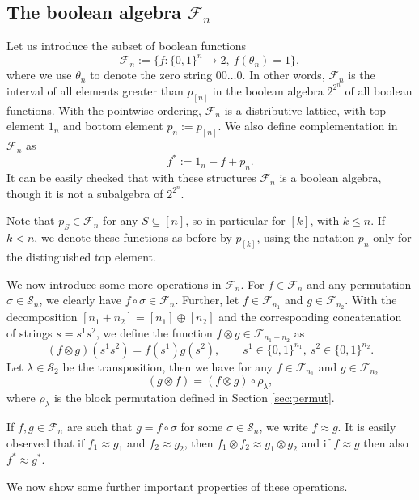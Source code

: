\documentclass[12pt]{article}
\theoremstyle{definition}
\theoremstyle{remark}
\def\Fe{\mathcal F}
\def\permut{\mathscr{S}}
\begin{document}

\subsection{The boolean algebra $\Fe_n$}


Let us introduce the subset of boolean functions 
\[
\Fe_n:=\{f:\{0,1\}^n\to 2,\ f(\theta_n)=1\},
\]
where we use $\theta_n$ to denote the zero string $00\dots 0$. 
In other words, $\Fe_n$ is the interval of all elements greater than $p_{[n]}$ in the boolean algebra 
$2^{2^n}$ of all boolean functions. With the pointwise ordering, $\Fe_n$ is a distributive lattice, with top element $1_n$ and 
 bottom element $p_n:=p_{[n]}$. We also define complementation  in $\Fe_n$ as
\[
f^*:=1_n-f+p_n.
\]
It can be easily checked that with these structures $\Fe_n$ is a boolean algebra, though
it is not a subalgebra of $2^{2^n}$.

Note that $p_S\in \Fe_n$ for any $S\subseteq [n]$, so in particular for $[k]$, with $k\le
n$. If $k<n$, we denote these functions as before by $p_{[k]}$, using the notation $p_n$
only for the distinguished top element.






We now introduce some more operations in $\Fe_n$. For $f\in \Fe_n$ and any permutation
$\sigma\in \permut_n$, we clearly have $f\circ \sigma\in \Fe_n$.
Further, let $f\in \Fe_{n_1}$ and $g\in \Fe_{n_2}$. With the decomposition
$[n_1+n_2]=[n_1]\oplus [n_2]$
and the corresponding concatenation of strings $s=s^1s^2$,  we define
the function $f\otimes g\in \Fe_{n_1+n_2}$ as
\[
(f\otimes g)(s^1s^2)=f(s^1)g(s^2),\qquad s^1\in \{0,1\}^{n_1},\ s^2\in \{0,1\}^{n_2}.
\]
Let $\lambda\in \permut_2$ be the transposition, then we have for any $f\in \Fe_{n_1}$ and
$g\in \Fe_{n_2}$
\[
(g\otimes f)=(f\otimes g)\circ \rho_\lambda,
\]
where $\rho_\lambda$ is the block permutation defined in  Section \ref{sec:permut}.

If $f,g\in \Fe_n$ are such that $g=f\circ\sigma$ for some $\sigma\in \permut_n$, we write
$f\approx g$. It is easily observed that if $f_1\approx g_1$ and $f_2\approx g_2$, then
$f_1\otimes f_2\approx g_1\otimes g_2$ and if $f\approx g$ then also $f^*\approx g^*$.


We now show some further important properties of these operations.
\end{document}
